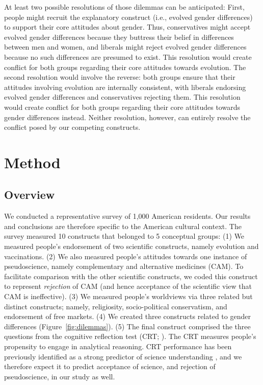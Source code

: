\documentclass[fignum,man]{apa}\usepackage[]{graphicx}\usepackage[]{color}
\begin{document}
At least two possible resolutions of those dilemmas can be anticipated:
First, people might recruit the explanatory construct (i.e., evolved
gender differences) to support their core attitudes about gender. Thus,
conservatives might accept evolved gender differences because they buttress
their belief in differences between men and women, and liberals might
reject evolved gender differences because no such differences are presumed to exist.
This resolution would create conflict for both groups regarding their core attitudes
towards evolution. The second resolution would involve the reverse: both groups 
ensure that their attitudes involving evolution are internally consistent, 
with liberals endorsing
evolved gender differences and conservatives rejecting them. This resolution 
would create conflict for both groups regarding their core attitudes towards 
gender differences instead.
Neither resolution, however, can entirely resolve the conflict posed by our competing
constructs.

\section{Method}

\subsection{Overview}
We conducted a representative survey of 1,000 American residents.
Our results and conclusions are therefore specific to the American cultural
context.
The survey 
measured 10 constructs that belonged
to 5 conceptual groups:
(1) We measured people's endorsement of
two scientific constructs, namely evolution and vaccinations.
(2) We also measured people's attitudes towards
one instance of pseudoscience, namely
complementary and alternative medicines (CAM). 
To facilitate comparison with the other scientific constructs,
we coded this construct to represent \textit{rejection }of CAM
(and hence acceptance of the scientific view that
CAM is ineffective).
(3) We measured people's worldviews via three
related but distinct constructs; namely,
religiosity, socio-political conservatism, and endorsement of free markets.
(4) We created three constructs related to gender differences (Figure~\ref{fig:dilemmas}).
(5) The final construct comprised the
three questions from the cognitive reflection test 
(CRT; ).
The CRT measures people's propensity to engage in analytical reasoning.
CRT performance 
has been previously identified as a 
strong predictor of science understanding \cite{Shtulman14}, and we therefore
expect it to predict acceptance of science, and rejection of pseudoscience, in our
study as well.
\end{document}

